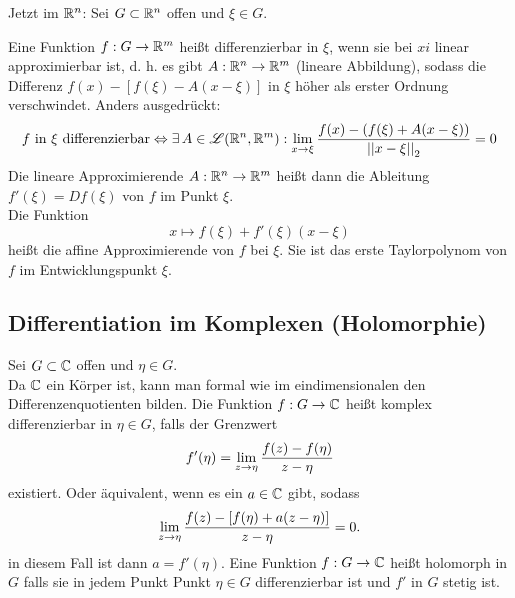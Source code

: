 \documentclass[../ana2u.tex]{subfiles}
\begin{document}
Jetzt im \(\mathbb{R}^n\):
Sei \(G \subset \mathbb{R}^n\) offen und \(\xi \in G\).
\begin{defi*}
    Eine Funktion \(f:G\rightarrow \mathbb{R}^m\) heißt differenzierbar in \(\xi\),
    wenn sie bei \(xi\) linear approximierbar ist, d. h. es gibt 
    \(A:\mathbb{R}^n\rightarrow \mathbb{R}^m\) (lineare Abbildung), sodass    
    die Differenz \( f(x) - [f(\xi) - A(x - \xi)] \) in \(\xi\)
    höher als erster Ordnung verschwindet.
    Anders ausgedrückt:
    \[ f \text{ in } \xi \text{ differenzierbar} \Leftrightarrow
    \exists A \in \mathscr{L}(\R^n, \R^m): \limesx{x}{\xi}
    \frac{f(x) - (f(\xi) + A(x-\xi))}{\norm{x-\xi}_2} = 0 \]
    Die lineare Approximierende \(A:\mathbb{R}^n\rightarrow \mathbb{R}^m\) heißt dann die
    Ableitung \(f'(\xi) = Df(\xi)\) von \(f\) im Punkt \(\xi\).\\
    Die Funktion 
    \[ x \mapsto f(\xi) + f'(\xi)(x-\xi) \]
    heißt die affine Approximierende von \(f\) bei \(\xi\). Sie ist das
    erste Taylorpolynom von \(f\) im Entwicklungspunkt \(\xi\).
\end{defi*}
\subsection{Differentiation im Komplexen (Holomorphie)}
Sei \(G \subset \mathbb{C}\) offen und \(\eta \in G\).\\
Da \(\mathbb{C}\) ein Körper ist, kann man formal wie im eindimensionalen
den Differenzenquotienten bilden. Die Funktion \(f:G\rightarrow \mathbb{C}\) heißt
komplex differenzierbar in \(\eta \in G\), falls der Grenzwert
\[ f'(\eta) = \lim\limits_{z\rightarrow{}\eta} \frac{f(z) - f(\eta)}{z - \eta} \]
existiert. Oder äquivalent, wenn es ein \(a \in \mathbb{C}\) gibt, sodass
\[ \lim\limits_{z\rightarrow{}\eta} \frac{ f(z) - [f(\eta) + a(z - \eta)] }{z - \eta} = 0. \]
in diesem Fall ist dann \(a = f'(\eta)\). Eine Funktion \(f:G\rightarrow \mathbb{C}\)
heißt holomorph in \(G\) falls sie in jedem Punkt
Punkt \(\eta\in G\) differenzierbar ist und \(f'\) in \(G\)
stetig ist.
\end{document}

